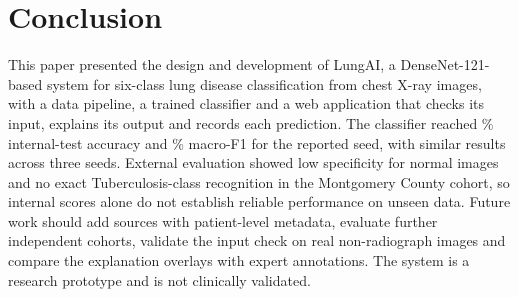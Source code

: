 \section{Conclusion}\label{sec:conclusion}
This paper presented the design and development of LungAI, a DenseNet-121-based system for six-class
lung disease classification from chest X-ray images, with a data pipeline, a trained classifier and a
web application that checks its input, explains its output and records each prediction. The classifier
reached \RTestAcc\% internal-test accuracy and \RTestMacroFOne\% macro-F1 for the reported seed, with
similar results across three seeds. External evaluation showed low specificity for normal images and no
exact Tuberculosis-class recognition in the Montgomery County cohort, so internal scores alone do not
establish reliable performance on unseen data. Future work should add sources with patient-level
metadata, evaluate further independent cohorts, validate the input check on real non-radiograph images
and compare the explanation overlays with expert annotations. The system is a research prototype and is
not clinically validated.

